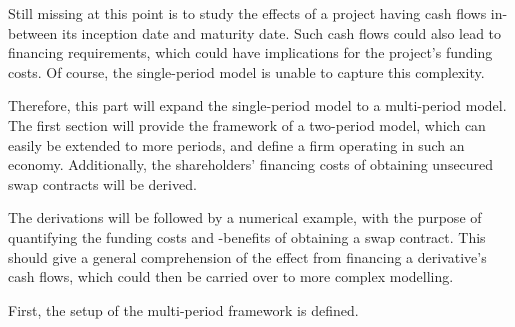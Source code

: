 \documentclass[main.tex]{subfiles}
\begin{document}
    Still missing at this point is to study the effects of a project
    having cash flows in-between its inception date and maturity date.
    Such cash flows could also lead to financing requirements,
    which could have implications for the project's funding costs.
    Of course, the single-period model is unable to capture this complexity.

    Therefore, this part will expand the single-period model to a multi-period model.
    The first section will provide the framework of a two-period model, 
    which can easily be extended to more periods,
    and define a firm operating in such an economy.
    Additionally, the shareholders' financing costs 
    of obtaining unsecured swap contracts will be derived.

    The derivations will be followed by a numerical example,
    with the purpose of quantifying the funding costs and -benefits of obtaining a swap contract.
    This should give a general comprehension of the effect from financing a derivative's cash flows,
    which could then be carried over to more complex modelling.

    First, the setup of the multi-period framework is defined.
\end{document}
